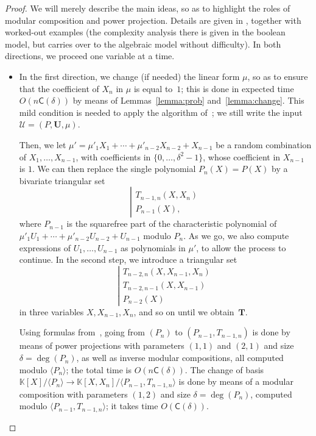 \documentclass[12pt]{article}
\def\CC {\ensuremath{\mathsf{C}}}
\def\K {\ensuremath{\mathbb{K}}}
\def\Tt {\ensuremath{\mathbf{T}}}
\def\Uu {\ensuremath{\mathbf{U}}}
\def\Ur {\ensuremath{\mathscr U}}
\begin{document}
\begin{proof}
  We will merely describe the main ideas, so as to highlight the roles
  of modular composition and power projection. Details are given in
  \cite[Section~5.3 and~6.3]{PoSc10}, together with worked-out
  examples (the complexity analysis there is given in the boolean
  model, but carries over to the algebraic model without
  difficulty). In both directions, we proceed one variable at a time.
  \begin{itemize}
  \item In the first direction, we change (if needed) the linear form
    $\mu$, so as to ensure that the coefficient of $X_n$ in $\mu$ is
    equal to~$1$; this is done in expected time $O(n\CC(\delta))$ by
    means of Lemmas~\ref{lemma:prob} and~\ref{lemma:change}. This mild
    condition is needed to apply the algorithm of~\cite{PoSc10}; we
    still write the input $\Ur=(P,\Uu,\mu)$.

    Then, we let $\mu'=\mu'_1 X_1+ \cdots+\mu'_{n-2}X_{n-2}+X_{n-1}$
    be a random combination of $X_1,\dots,X_{n-1}$, with coefficients
    in $\{0,\dots,\delta^2-1\}$, whose coefficient in $X_{n-1}$ is
    $1$. We can then replace the single polynomial $P_{n}(X)=P(X)$ by
    a bivariate triangular set
    \[ \left | \begin{array}{l}
        T_{n-1,n}(X,X_n) \\
        P_{n-1}(X),
      \end{array}\right .\]
    where $P_{n-1}$ is the squarefree part of the characteristic
    polynomial of $\mu'_1 U_1+ \cdots+\mu'_{n-2}U_{n-2}+U_{n-1}$
    modulo $P_n$. As we go, we also compute expressions of
    $U_1,\dots,U_{n-1}$ as polynomials in $\mu'$, to allow the process to 
    continue. In the second step, we introduce a triangular set
    \[ \left | \begin{array}{l}
        T_{n-2,n}(X,X_{n-1},X_n) \\
        T_{n-2,n-1}(X,X_{n-1})\\
        P_{n-2}(X)
      \end{array}\right .\]
    in three variables $X,X_{n-1},X_n$, and so on until we
    obtain~$\Tt$.

    Using formulas from~\cite{PaSc06,PoSc10}, going from $(P_{n})$ to
    $(P_{n-1},T_{n-1,n})$ is done by means of power projections with
    parameters $(1,1)$ and $(2,1)$ and size $\delta =\deg(P_{n})$, as
    well as inverse modular compositions, all computed modulo $\langle
    P_{n}\rangle$; the total time is $O(n \CC(\delta))$. The change of
    basis $\K[X]/\langle P_{n}\rangle \to \K[X,X_n]/\langle
    P_{n-1},T_{n-1,n}\rangle$ is done by means of a modular
    composition with parameters $(1,2)$ and size $\delta
    =\deg(P_{n})$, computed modulo $\langle P_{n-1},T_{n-1,n}
    \rangle$; it takes time $O(\CC(\delta))$.


\end{itemize}
\end{proof}
\end{document}
